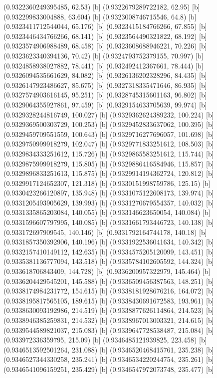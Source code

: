 {{{(0.9322360249395485, 62.53) [b] 
(0.9322679289722182, 62.95) [b] 
(0.932299833004888, 63.604) [b] 
(0.9323008746715546, 64.8) [b] 
(0.9323411712544044, 65.176) [b] 
(0.9323415184766266, 67.855) [b] 
(0.9323446434766266, 68.141) [b] 
(0.9323564490321822, 68.192) [b] 
(0.9323574906988489, 68.458) [b] 
(0.9323608688946221, 70.226) [b] 
(0.9323623340394136, 70.42) [b] 
(0.9324793752379155, 70.997) [b] 
(0.9324858938027882, 78.441) [b] 
(0.932492412367661, 78.444) [b] 
(0.9326094535661629, 84.082) [b] 
(0.9326136202328296, 84.435) [b] 
(0.9326147923486627, 85.675) [b] 
(0.9327318335471646, 86.935) [b] 
(0.9327574903616145, 95.251) [b] 
(0.9328745315601163, 96.802) [b] 
(0.9329064355927861, 97.459) [b] 
(0.9329154633705639, 99.974) [b] 
(0.9329328244816749, 100.027) [b] 
(0.9329362624389232, 100.224) [b] 
(0.9329369500303729, 100.253) [b] 
(0.9329452833637062, 100.395) [b] 
(0.9329459709551559, 100.643) [b] 
(0.9329716277696057, 101.698) [b] 
(0.9329750999918279, 102.047) [b] 
(0.9329771833251612, 108.503) [b] 
(0.9329834333251612, 115.726) [b] 
(0.9329865583251612, 115.744) [b] 
(0.9329875999918279, 115.805) [b] 
(0.9329886416584946, 115.857) [b] 
(0.9329896833251613, 115.875) [b] 
(0.9329914194362724, 120.812) [b] 
(0.9329917124652307, 121.318) [b] 
(0.9330151998759786, 125.15) [b] 
(0.9330423266120897, 135.948) [b] 
(0.9331075122608173, 139.974) [b] 
(0.9331205493905629, 139.993) [b] 
(0.9331270679554357, 140.032) [b] 
(0.9331335865203084, 140.055) [b] 
(0.933146623650054, 140.084) [b] 
(0.9331596607797995, 140.085) [b] 
(0.9331661793446723, 140.138) [b] 
(0.933172697909545, 140.146) [b] 
(0.9331792164744178, 140.18) [b] 
(0.9331857350392906, 140.196) [b] 
(0.9331922536041634, 140.342) [b] 
(0.9332157410149112, 142.635) [b] 
(0.9334575205120099, 143.451) [b] 
(0.9335381136777094, 143.518) [b] 
(0.9335784102605592, 144.324) [b] 
(0.933618706843409, 144.728) [b] 
(0.9336200957322979, 145.464) [b] 
(0.9336204429545201, 145.588) [b] 
(0.9336509456387563, 148.251) [b] 
(0.9338174984231772, 154.615) [b] 
(0.9338181928676216, 164.072) [b] 
(0.9338195817565105, 189.615) [b] 
(0.9338430691672583, 193.961) [b] 
(0.9338630093192986, 214.519) [b] 
(0.9338877626114864, 214.523) [b] 
(0.9338946385259831, 214.532) [b] 
(0.9338967013003321, 214.615) [b] 
(0.9339544589821037, 215.083) [b] 
(0.9339647728538487, 215.084) [b] 
(0.933972336359795, 215.09) [b] 
(0.9346485121939825, 223.458) [b] 
(0.9346513592501264, 231.088) [b] 
(0.9346520468415761, 235.238) [b] 
(0.9346527344330258, 235.241) [b] 
(0.9346534220244754, 235.261) [b] 
(0.9346541096159251, 235.429) [b] 
(0.9346547972073748, 235.477) [b] 
}}}
